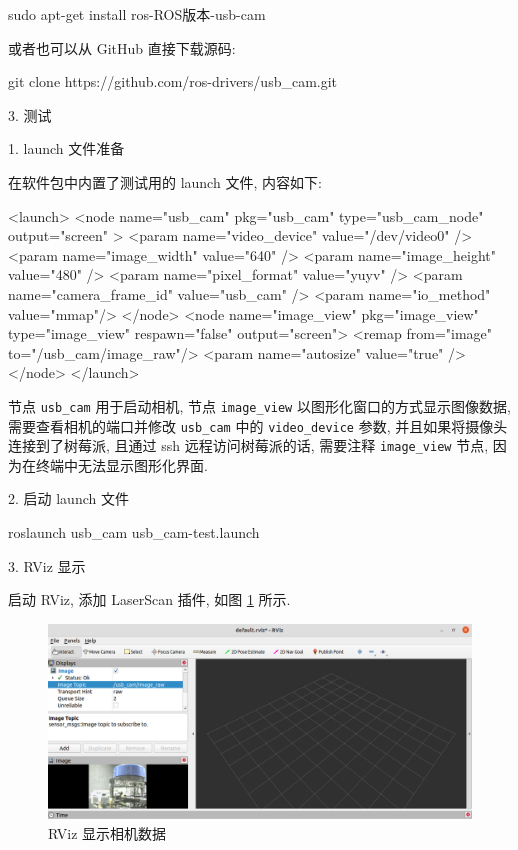 \documentclass[openany, fontset=windowsold]{ctexbook}
\theoremstyle{kaiti}
\theoremstyle{normal}
\begin{document}
\begin{bash}
  sudo apt-get install ros-ROS版本-usb-cam
\end{bash}

或者也可以从 GitHub 直接下载源码:

\begin{bash}
  git clone https://github.com/ros-drivers/usb_cam.git
\end{bash}

3. 测试

1. launch 文件准备

在软件包中内置了测试用的 launch 文件, 内容如下:

\begin{xml}
  <launch>
    <node name="usb_cam" pkg="usb_cam" type="usb_cam_node" output="screen" >
      <param name="video_device" value="/dev/video0" />
      <param name="image_width" value="640" />
      <param name="image_height" value="480" />
      <param name="pixel_format" value="yuyv" />
      <param name="camera_frame_id" value="usb_cam" />
      <param name="io_method" value="mmap"/>
    </node>
    <node name="image_view" pkg="image_view" type="image_view" respawn="false" output="screen">
      <remap from="image" to="/usb_cam/image_raw"/>
      <param name="autosize" value="true" />
    </node>
  </launch>
\end{xml}

节点 \verb|usb_cam| 用于启动相机, 节点 \verb|image_view| 以图形化窗口的方式显示图像数据, 需要查看相机的端口并修改 \verb|usb_cam| 中的 \verb|video_device| 参数, 并且如果将摄像头连接到了树莓派, 且通过 ssh 远程访问树莓派的话, 需要注释 \verb|image_view| 节点, 因为在终端中无法显示图形化界面.

2. 启动 launch 文件

\begin{bash}
  roslaunch usb_cam usb_cam-test.launch
\end{bash}

3. RViz 显示

启动 RViz, 添加 LaserScan 插件, 如图 \ref{fig:rviz_show_camera} 所示.

\begin{figure}[!ht]
  \centering
  \includegraphics[width=.8\textwidth]{rviz_show_camera.png}
  \caption{RViz 显示相机数据}
  \label{fig:rviz_show_camera}
\end{figure}
\end{document}
